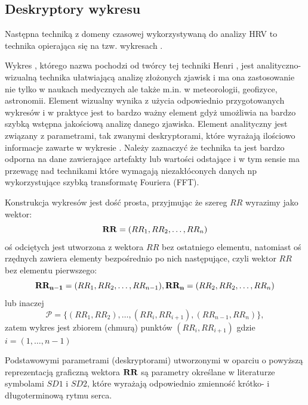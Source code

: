\subsection{Deskryptory wykresu \PP{}}


Następna techniką z domeny czasowej wykorzystywaną do analizy HRV to technika opierająca
się na tzw. wykresach \PP{}.

Wykres \PP{}, którego nazwa pochodzi od twórcy tej techniki Henri \PP{}, jest 
analityczno-wizualną technika ułatwiającą analizę złożonych zjawisk i ma ona zastosowanie
nie tylko w naukach medycznych ale także m.in. w meteorologii, geofizyce, astronomii.
Element wizualny wynika z użycia odpowiednio przygotowanych wykresów i w praktyce jest to
bardzo ważny element gdyż umożliwia na bardzo szybką wstępna jakościową analizę danego
zjawiska. Element analityczny jest związany z parametrami, tak zwanymi deskryptorami,
które wyrażają ilościowo informacje zawarte w wykresie \PP{}. Należy zaznaczyć że
technika ta jest bardzo odporna na dane zawierające artefakty lub wartości odstające i w
tym sensie ma przewagę nad technikami które wymagają niezakłóconych danych np 
wykorzystujące szybką transformatę Fouriera (FFT).

Konstrukcja wykresów \PP{} jest dość prosta, przyjmując że szereg $RR$ wyrazimy jako
wektor:
\begin{equation}
\mathbf{RR} = (RR_{1}, RR_{2}, \ldots, RR_{n})
\end{equation}
oś odciętych jest utworzona z wektora $RR$ bez ostatniego elementu, natomiast oś rzędnych
zawiera elementy bezpośrednio po nich następujące, czyli wektor $RR$ bez elementu
pierwszego:
\begin{equation}
\mathbf{RR_{n-1}} = (RR_{1}, RR_{2}, \ldots, RR_{n-1}),
\mathbf{RR_n} = (RR_{2}, RR_{2}, \ldots, RR_{n}) 
\end{equation}
lub inaczej
\begin{equation}
  \mathcal{P} = \{(RR_1, RR_2),\ldots, (RR_i, RR_{i+1}), (RR_{n-1}, RR_n )\},
 \label{eq:p_plot}
\end{equation}
zatem wykres \PP{} jest zbiorem (chmurą) punktów $(RR_{i}, RR_{i+1})$ gdzie $i=(1, \ldots, n-1)$

Podstawowymi parametrami (deskryptorami) utworzonymi w oparciu o powyższą reprezentacją 
graficzną wektora $\mathbf{RR}$ są parametry określane w literaturze symbolami $SD1$ i $SD2$, które
wyrażają odpowiednio zmienność krótko- i długoterminową rytmu serca.


